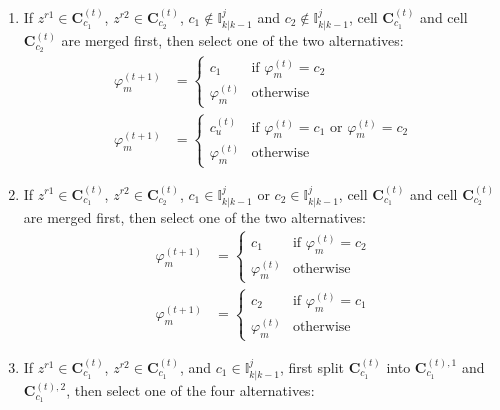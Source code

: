 \begin{enumerate}
    \item If $z^{r1}\in\mathbf{C}_{c_1}^{(t)}$, $z^{r2}\in\mathbf{C}_{c_2}^{(t)}$, $c_1\notin\mathbb{I}^j_{k|k-1}$ and $c_2\notin\mathbb{I}^j_{k|k-1}$, cell $\mathbf{C}_{c_1}^{(t)}$ and cell $\mathbf{C}_{c_2}^{(t)}$ are merged first, then select one of the two alternatives:
    \begin{subequations}
    \begin{align}
        \varphi_m^{(t+1)} & = 
        \begin{cases}
            c_1 & \text{if  } \varphi_m^{(t)}=c_2\\
            \varphi_m^{(t)} & \text{otherwise}
        \end{cases}\\
        \varphi_m^{(t+1)} & = 
        \begin{cases}
            c_u^{(t)} & \text{if  } \varphi_m^{(t)}=c_1 \text{  or  } \varphi_m^{(t)}=c_2\\
            \varphi_m^{(t)} & \text{otherwise}
        \end{cases}
    \end{align}
    \end{subequations}
    \item If $z^{r1}\in\mathbf{C}_{c_1}^{(t)}$, $z^{r2}\in\mathbf{C}_{c_2}^{(t)}$, $c_1\in\mathbb{I}^j_{k|k-1}$ or $c_2\in\mathbb{I}^j_{k|k-1}$, cell $\mathbf{C}_{c_1}^{(t)}$ and cell $\mathbf{C}_{c_2}^{(t)}$ are merged first, then select one of the two alternatives: 
    \begin{subequations}
    \begin{align}
        \varphi_m^{(t+1)} & = 
        \begin{cases}
            c_1 & \text{if  } \varphi_m^{(t)}=c_2\\
            \varphi_m^{(t)} & \text{otherwise}
        \end{cases}\\
        \varphi_m^{(t+1)} & = 
        \begin{cases}
            c_2 & \text{if  } \varphi_m^{(t)}=c_1\\
            \varphi_m^{(t)} & \text{otherwise}
        \end{cases}
    \end{align}
    \end{subequations}
    \item If $z^{r1}\in\mathbf{C}_{c_1}^{(t)}$, $z^{r2}\in\mathbf{C}_{c_1}^{(t)}$, and $c_1\in\mathbb{I}^j_{k|k-1}$, first split $\mathbf{C}_{c_1}^{(t)}$ into $\mathbf{C}_{c_1}^{(t),1}$ and $\mathbf{C}_{c_1}^{(t),2}$, then select one of the four alternatives: 

\end{enumerate}
